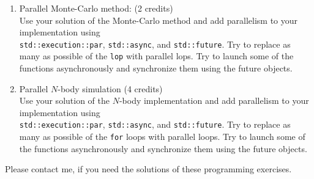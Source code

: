 \documentclass[11pt]{article}
\begin{document}
\begin{enumerate}

\item Parallel Monte-Carlo method: (2 credits)\\
Use your solution of the Monte-Carlo method and add parallelism to your implementation using \\
\lstinline|std::execution::par|, \lstinline|std::async|, and \lstinline|std::future|. Try to replace as many as possible of the \lstinline|lop| with parallel lops. Try to launch some of the functions asynchronously and synchronize them using the future objects. 

\item Parallel $N$-body simulation (4 credits)\\
Use your solution of the $N$-body implementation and add parallelism to your implementation using \\
\lstinline|std::execution::par|, \lstinline|std::async|, and \lstinline|std::future|. Try to replace as many as possible of the \lstinline|for| loops with parallel loops. Try to launch some of the functions asynchronously and synchronize them using the future objects. 

\end{enumerate}
Please contact me, if you need the solutions of these programming exercises.
\doclicenseThis 
\end{document}
